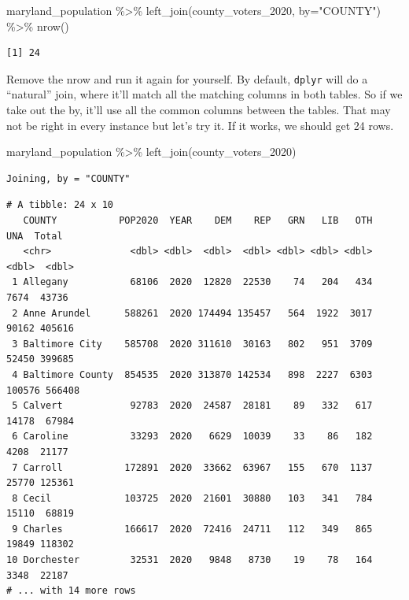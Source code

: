 \documentclass[
  letterpaper,
  DIV=11,
  numbers=noendperiod]{scrreprt}
\newenvironment{Shaded}{\begin{snugshade}}{\end{snugshade}}
\newcommand{\AttributeTok}[1]{\textcolor[rgb]{0.40,0.45,0.13}{#1}}
\newcommand{\FunctionTok}[1]{\textcolor[rgb]{0.28,0.35,0.67}{#1}}
\newcommand{\NormalTok}[1]{\textcolor[rgb]{0.00,0.23,0.31}{#1}}
\newcommand{\SpecialCharTok}[1]{\textcolor[rgb]{0.37,0.37,0.37}{#1}}
\newcommand{\StringTok}[1]{\textcolor[rgb]{0.13,0.47,0.30}{#1}}
\begin{document}
\begin{Shaded}
\begin{Highlighting}[]
\NormalTok{maryland\_population }\SpecialCharTok{\%\textgreater{}\%} \FunctionTok{left\_join}\NormalTok{(county\_voters\_2020, }\AttributeTok{by=}\StringTok{"COUNTY"}\NormalTok{) }\SpecialCharTok{\%\textgreater{}\%} \FunctionTok{nrow}\NormalTok{()}
\end{Highlighting}
\end{Shaded}

\begin{verbatim}
[1] 24
\end{verbatim}

Remove the nrow and run it again for yourself. By default,
\texttt{dplyr} will do a ``natural'' join, where it'll match all the
matching columns in both tables. So if we take out the by, it'll use all
the common columns between the tables. That may not be right in every
instance but let's try it. If it works, we should get 24 rows.

\begin{Shaded}
\begin{Highlighting}[]
\NormalTok{maryland\_population }\SpecialCharTok{\%\textgreater{}\%} \FunctionTok{left\_join}\NormalTok{(county\_voters\_2020)}
\end{Highlighting}
\end{Shaded}

\begin{verbatim}
Joining, by = "COUNTY"
\end{verbatim}

\begin{verbatim}
# A tibble: 24 x 10
   COUNTY           POP2020  YEAR    DEM    REP   GRN   LIB   OTH    UNA  Total
   <chr>              <dbl> <dbl>  <dbl>  <dbl> <dbl> <dbl> <dbl>  <dbl>  <dbl>
 1 Allegany           68106  2020  12820  22530    74   204   434   7674  43736
 2 Anne Arundel      588261  2020 174494 135457   564  1922  3017  90162 405616
 3 Baltimore City    585708  2020 311610  30163   802   951  3709  52450 399685
 4 Baltimore County  854535  2020 313870 142534   898  2227  6303 100576 566408
 5 Calvert            92783  2020  24587  28181    89   332   617  14178  67984
 6 Caroline           33293  2020   6629  10039    33    86   182   4208  21177
 7 Carroll           172891  2020  33662  63967   155   670  1137  25770 125361
 8 Cecil             103725  2020  21601  30880   103   341   784  15110  68819
 9 Charles           166617  2020  72416  24711   112   349   865  19849 118302
10 Dorchester         32531  2020   9848   8730    19    78   164   3348  22187
# ... with 14 more rows
\end{verbatim}
\end{document}
